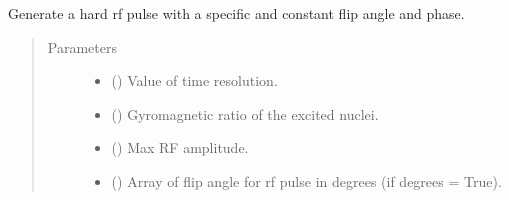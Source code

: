 \documentclass[a4paper,10pt,english]{sphinxmanual}
\begin{document}
\begin{fulllineitems}
\label{\detokenize{autodoc/mrsprint/mrsprint.system:mrsprint.system.rf.square_rf_pulse}}
Generate a hard rf pulse with a specific and constant flip angle and phase.
\begin{quote}\begin{description}
\item[{Parameters}] \leavevmode\begin{itemize}
\item {} 
 (\sphinxstyleliteralemphasis{\sphinxupquote{ {[}}}\sphinxstyleliteralemphasis{\sphinxupquote{{]}}}) \textendash{} Value of time resolution.

\item {} 
 (\sphinxstyleliteralemphasis{\sphinxupquote{ {[}}}\sphinxstyleliteralemphasis{\sphinxupquote{(}}\sphinxstyleliteralemphasis{\sphinxupquote{)}}\sphinxstyleliteralemphasis{\sphinxupquote{{]}}}) \textendash{} Gyromagnetic ratio of the excited nuclei.

\item {} 
 (\sphinxstyleliteralemphasis{\sphinxupquote{ {[}}}\sphinxstyleliteralemphasis{\sphinxupquote{{]}}}) \textendash{} Max RF amplitude.

\item {} 
 (\sphinxstyleliteralemphasis{\sphinxupquote{ {[}}}\sphinxstyleliteralemphasis{\sphinxupquote{, }}\sphinxstyleliteralemphasis{\sphinxupquote{{]}}}) \textendash{} Array of flip angle for rf pulse in degrees (if degrees = True).


\end{itemize}
\end{description}
\end{quote}
\end{fulllineitems}
\end{document}
